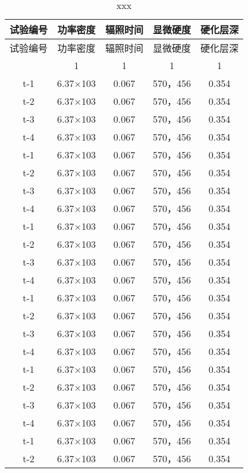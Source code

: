 \begin{longtable}{ccccc}
\caption{xxx}
\label{tab:xxx} \\
\hline
试验编号 & 功率密度 & 辐照时间 & 显微硬度       & 硬化层深\\ 
\hline
\endfirsthead
\hline
试验编号 & 功率密度 & 辐照时间 & 显微硬度       & 硬化层深\\ 
\hline
\endhead

\hline
\endfoot
\hline 
1&1&1&1&1\\
\hline
\endlastfoot
t-1     &6.37×103       &0.067  &570，456        &0.354\\
t-2     &6.37×103       &0.067  &570，456        &0.354\\
t-3     &6.37×103       &0.067  &570，456        &0.354\\
t-4     &6.37×103       &0.067  &570，456        &0.354\\
t-1     &6.37×103       &0.067  &570，456        &0.354\\
t-2     &6.37×103       &0.067  &570，456        &0.354\\
t-3     &6.37×103       &0.067  &570，456        &0.354\\
t-4     &6.37×103       &0.067  &570，456        &0.354\\
t-1     &6.37×103       &0.067  &570，456        &0.354\\
t-2     &6.37×103       &0.067  &570，456        &0.354\\
t-3     &6.37×103       &0.067  &570，456        &0.354\\
t-4     &6.37×103       &0.067  &570，456        &0.354\\
t-1     &6.37×103       &0.067  &570，456        &0.354\\
t-2     &6.37×103       &0.067  &570，456        &0.354\\
t-3     &6.37×103       &0.067  &570，456        &0.354\\
t-4     &6.37×103       &0.067  &570，456        &0.354\\
t-1     &6.37×103       &0.067  &570，456        &0.354\\
t-2     &6.37×103       &0.067  &570，456        &0.354\\
t-3     &6.37×103       &0.067  &570，456        &0.354\\
t-4     &6.37×103       &0.067  &570，456        &0.354\\
t-1     &6.37×103       &0.067  &570，456        &0.354\\
t-2     &6.37×103       &0.067  &570，456        &0.354\\

\end{longtable}
